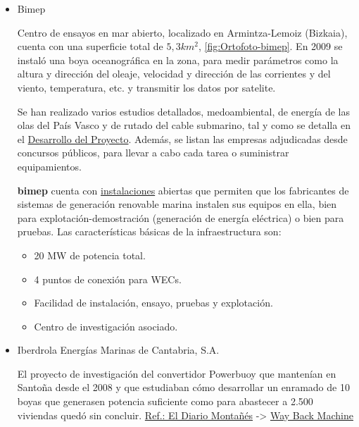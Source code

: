 \begin{itemize}
\item
  Bimep

  Centro de ensayos en mar abierto, localizado en Armintza-Lemoiz
  (Bizkaia), cuenta con una superficie total de \(5,3 km^2\), \autoref{fig:Ortofoto-bimep}. En 2009 se
  instaló una boya oceanográfica en la zona, para medir parámetros como
  la altura y dirección del oleaje, velocidad y dirección de las
  corrientes y del viento, temperatura, etc. y transmitir los datos por
  satelite.



  Se han realizado varios estudios detallados, medoambiental, de energía
  de las olas del País Vasco y de rutado del cable submarino, tal y como
  se detalla en el
  \href{http://bimep.com/sobre-bimep/desarrollo-del-proyecto/}{Desarrollo
  del Proyecto}. Además, se listan las empresas adjudicadas desde
  concursos públicos, para llevar a cabo cada tarea o suministrar
  equipamientos.

  \textbf{bimep} cuenta con
  \href{http://bimep.com/sobre-bimep/instalaciones/}{instalaciones}
  abiertas que permiten que los fabricantes de sistemas de generación
  renovable marina instalen sus equipos en ella, bien para
  explotación-demostración (generación de energía eléctrica) o bien para
  pruebas. Las características básicas de la infraestructura son:

  \begin{itemize}
  \item
    20 MW de potencia total.
  \item
    4 puntos de conexión para WECs.
  \item
    Facilidad de instalación, ensayo, pruebas y explotación.
  \item
    Centro de investigación asociado.
  \end{itemize}
\item
  Iberdrola Energías Marinas de Cantabria, S.A.

  El proyecto de investigación del convertidor Powerbuoy que mantenían
  en Santoña desde el 2008 y que estudiaban cómo desarrollar un enramado
  de 10 boyas que generasen potencia suficiente como para abastecer a
  2.500 viviendas quedó sin concluir.
  \href{http://www.eldiariomontanes.es/20131116/local/castro-oriental/abandono-proyecto-iberdrola-santona-201311161639.html}{Ref.:
  El Diario Montañés} -\textgreater{}
  \href{https://web.archive.org/web/20170904012830/http://www.eldiariomontanes.es/20131116/local/castro-oriental/abandono-proyecto-iberdrola-santona-201311161639.html}{Way
  Back Machine}


\end{itemize}

